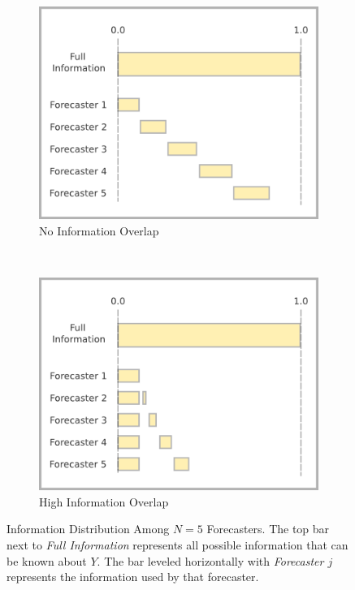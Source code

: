 \documentclass[12pt]{article}
\theoremstyle{definition}
\theoremstyle{definition}
\begin{document}
\begin{figure}[t!]
        \centering
        \begin{subfigure}[b]{0.49\textwidth}
                \includegraphics[width=\textwidth]{IndepDiagram}
                \caption{No Information Overlap}
                \label{DiagramsA}
        \end{subfigure}%
        ~ %
        \begin{subfigure}[b]{0.49\textwidth}
                \includegraphics[width=\textwidth]{DepDiagram}
                \caption{High Information Overlap}
                \label{DiagramsB}
        \end{subfigure}
   \caption{Information Distribution Among $N = 5$ Forecasters. The top bar next to \textit{Full Information} represents all possible information that can be known about $Y$. The bar leveled horizontally with \textit{Forecaster $j$} represents the information used by that forecaster.}    
        \label{Diagrams}
\end{figure}
\end{document}
